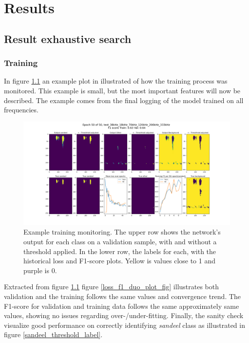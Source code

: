 \clearpage
\chapter{Results}

\section{Result exhaustive search}
    
    \subsection{Training}
        In figure \ref{training_overveiw_fig} an example plot in illustrated of how the training process was monitored. This example is small, but the most important features will now be described. The example comes from the final logging of the model trained on all frequencies.
        \clearpage
        \begin{figure}[H]
            \centering
            \includegraphics[scale=0.3]{figures/epoch_50_test_38kHz_18kHz_70kHz_120kHz_200kHz_333kHz.png}
            \caption[Training example monitoring]{Example training monitoring. The upper row shows the network's output for each class on a validation sample, with and without a threshold applied. In the lower row, the labels for each, with the historical loss and F1-score plots. Yellow is values close to 1 and purple is 0.}
          	\medskip 
            \label{training_overveiw_fig}
        \end{figure}
        
        
        Extracted from figure \ref{training_overveiw_fig} figure \ref{loss_f1_duo_plot_fig} illustrates both validation and the training follows the same values and convergence trend. The F1-score for validation and training data follows the same approximately same values, showing no issues regarding over-/under-fitting. Finally, the sanity check visualize good performance on correctly identifying \textit{sandeel} class as illustrated in figure \ref{sandeel_threshold_label}.%
        
